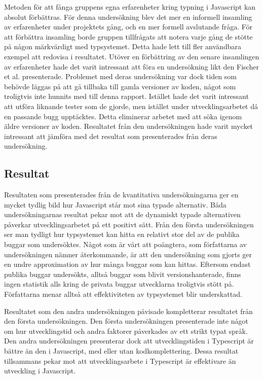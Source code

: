 Metoden för att fånga gruppens egna erfarenheter kring typning i Javascript kan absolut förbättras. För denna undersökning blev det mer en informell insamling av erfarenheter under projektets gång, och en mer formell avslutande fråga. För att förbättra insamling borde gruppen tillfrågats att notera varje gång de stötte på någon märkvärdigt med typsystemet. Detta hade lett till fler användbara exempel att redovisa i resultatet. Utöver en förbättring av den senare insamlingen av erfarenheter hade det varit intressant att föra en undersökning likt den Fischer et al. presenterade. Problemet med deras undersökning var dock tiden som behövde läggas på att gå tillbaka till gamla versioner av koden, något som troligtvis inte hunnits med till denna rapport. Istället hade det varit intressant att utföra liknande tester som de gjorde, men istället under utvecklingsarbetet då en passande bugg upptäcktes. Detta eliminerar arbetet med att söka igenom äldre versioner av koden. Resultatet från den undersökningen hade varit mycket intressant att jämföra med det resultat som presenterades från deras undersökning.



\subsection{Resultat}
\label{subsec:alexander-discussion-results}

Resultaten som presenterades från de kvantitativa undersökningarna ger en mycket tydlig bild hur Javascript står mot sina typade alternativ. Båda undersökningarnas resultat pekar mot att de dynamiskt typade alternativen påverkar utvecklingsarbetet på ett positivt sätt. Från den första undersökningen ser man tydligt hur typsystemet kan hitta en relativt stor del av de publika buggar som undersöktes. Något som är värt att poängtera, som författarna av undersökningen nämner återkommande, är att den undersökning som gjorts ger en undre approximation av hur många buggar som kan hittas. Eftersom endast publika buggar undersökts, alltså buggar som blivit versionshanterade, finns ingen statistik alls kring de privata buggar utvecklarna troligtvis stött på. Författarna menar alltså att effektiviteten av typsystemet blir underskattad.

Resultatet som den andra undersökningen påvisade kompletterar resultatet från den första undersökningen.  Den första undersökningen presenterade inte något om hur utvecklingstid och andra faktorer påverkades av ett strikt typat språk. Den andra undersökningen presenterar dock att utvecklingstiden i Typescript är bättre än den i Javascript, med eller utan kodkomplettering. Dessa resultat tillsammans pekar mot att utvecklingsarbete i Typescript är effektivare än utveckling i Javascript. 

